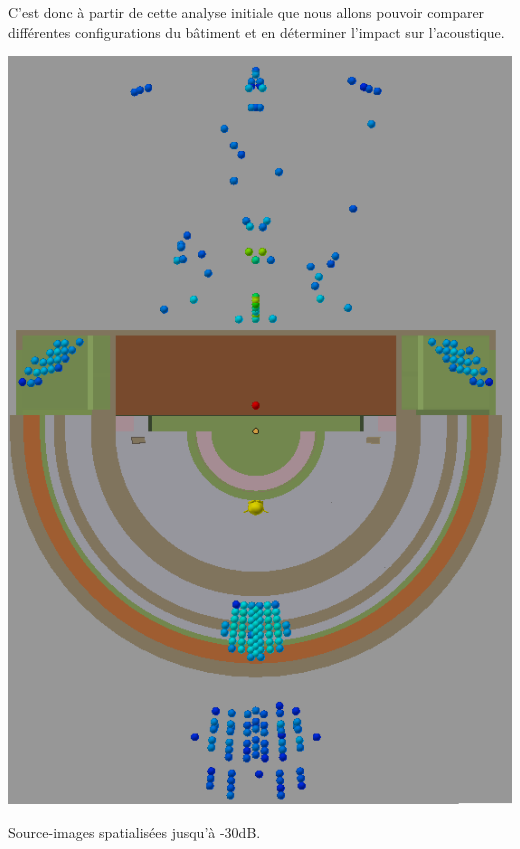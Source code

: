 C'est donc à partir de cette analyse initiale que nous allons pouvoir comparer différentes configurations du bâtiment et en déterminer l'impact sur l'acoustique.
% 
\begin{figureth}	
	\begin{subfigureth}{0.36\textwidth}
		\includegraphics[width=\linewidth]{images/SI30dBbis}
		\caption{Source-images spatialisées jusqu'à -30dB.}
		\label{SI30dBbis}
	\end{subfigureth}
	\begin{subfigureth}{0.61\textwidth}

\end{subfigureth}
\end{figureth}

